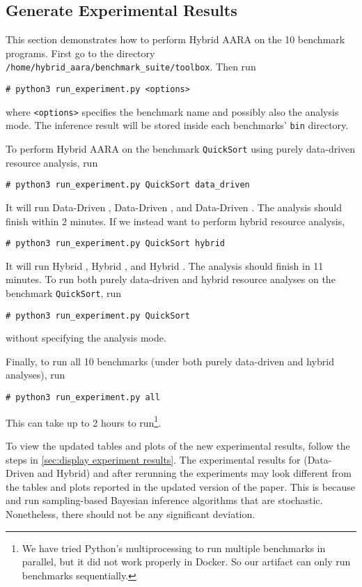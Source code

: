\subsection{Generate Experimental Results}
\label{sec:generate experiment results}

This section demonstrates how to perform Hybrid AARA on the 10 benchmark
programs.
%
First go to the directory \texttt{/home/hybrid\_aara/benchmark\_suite/toolbox}.
%
Then run
\begin{verbatim}
# python3 run_experiment.py <options>
\end{verbatim}
where \texttt{<options>} specifies the benchmark name and possibly also the
analysis mode.
%
The inference result will be stored inside each benchmarks' \texttt{bin}
directory.

To perform Hybrid AARA on the benchmark \texttt{QuickSort} using purely
data-driven resource analysis, run
\begin{verbatim}
# python3 run_experiment.py QuickSort data_driven
\end{verbatim}
%
It will run Data-Driven \Opt{}, Data-Driven \BayesWC{}, and Data-Driven
\BayesPC{}.
%
The analysis should finish within 2 minutes.
%
If we instead want to perform hybrid resource analysis,
\begin{verbatim}
# python3 run_experiment.py QuickSort hybrid
\end{verbatim}
%
It will run Hybrid \Opt{}, Hybrid \BayesWC{}, and Hybrid \BayesPC{}.
%
The analysis should finish in 11 minutes.
%
To run both purely data-driven and hybrid resource analyses on the benchmark
\texttt{QuickSort}, run
\begin{verbatim}
# python3 run_experiment.py QuickSort
\end{verbatim}
without specifying the analysis mode.

Finally, to run all 10 benchmarks (under both purely data-driven and hybrid
analyses), run
\begin{verbatim}
# python3 run_experiment.py all
\end{verbatim}
This can take up to 2 hours to run\footnote{We have tried Python's
multiprocessing to run multiple benchmarks in parallel, but it did not work
properly in Docker. So our artifact can only run benchmarks sequentially.}.

To view the updated tables and plots of the new experimental results, follow the
steps in \cref{sec:display experiment results}.
%
The experimental results for (Data-Driven and Hybrid) \BayesWC{} and \BayesPC{}
after rerunning the experiments may look different from the tables and plots
reported in the updated version of the paper.
%
This is because \BayesWC{} and \BayesPC{} run sampling-based Bayesian inference
algorithms that are stochastic.
%
Nonetheless, there should not be any significant deviation.

